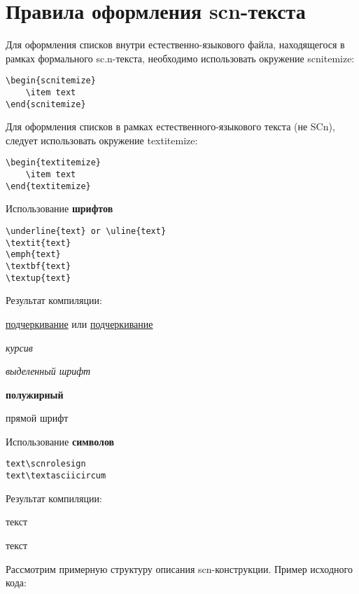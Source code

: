 \section*{Правила оформления scn-текста}

Для оформления списков внутри естественно-языкового файла, находящегося в рамках формального sc.n-текста, необходимо использовать окружение scnitemize:
\begin{lstlisting}              
\begin{scnitemize}
	\item text
\end{scnitemize}
\end{lstlisting}  

Для оформления списков в рамках естественного-языкового текста (не SCn), следует использовать окружение textitemize:
\begin{lstlisting}              
\begin{textitemize}
	\item text
\end{textitemize}
\end{lstlisting}  

Использование \textbf{шрифтов}

\begin{lstlisting}
\underline{text} or \uline{text}
\textit{text}
\emph{text}
\textbf{text}
\textup{text}
\end{lstlisting}

Результат компиляции:

\underline{подчеркивание} или \uline{подчер\-кивание}

\textit{курсив}

\emph{выделенный шрифт}

\textbf{полужирный}

\textup{прямой шрифт}

Использование \textbf{символов}

\begin{lstlisting}
text\scnrolesign
text\textasciicircum
\end{lstlisting}

Результат компиляции:

	текст\scnrolesign
	
	текст\scnsupergroupsign

Рассмотрим примерную структуру описания scn-конструкции. Пример исходного кода:

